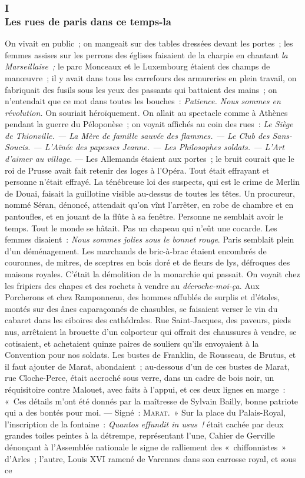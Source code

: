 \documentclass[french,twoside]{book} %
\begin{document}
\subsubsection[{I. Les rues de paris dans ce temps-la}]{I \\
Les rues de paris dans ce temps-la}
\label{p2l1c1}
\noindent On vivait en public ; on mangeait sur des tables dressées devant les portes ; les femmes assises sur les perrons des églises faisaient de la charpie en chantant \emph{la Marseillaise ;} le parc Monceaux et le Luxembourg étaient des champs de manœuvre ; il y avait dans tous les carrefours des armureries en plein travail, on fabriquait des fusils sous les yeux des passants qui battaient des mains ; on n’entendait que ce mot dans toutes les bouches : \emph{Patience. Nous sommes en révolution.} On souriait héroïquement. On allait au spectacle comme à Athènes pendant la guerre du Péloponèse ; on voyait affichés au coin des rues : \emph{Le Siège de Thionville. — La Mère de famille sauvée des flammes. — Le Club des Sans-Soucis. — L’Aînée des papesses Jeanne. — Les Philosophes soldats. — L’Art  d’aimer au village}. — Les Allemands étaient aux portes ; le bruit courait que le roi de Prusse avait fait retenir des loges à l’Opéra. Tout était effrayant et personne n’était effrayé. La ténébreuse loi des suspects, qui est le crime de Merlin de Douai, faisait la guillotine visible au-dessus de toutes les têtes. Un procureur, nommé Séran, dénoncé, attendait qu’on vînt l’arrêter, en robe de chambre et en pantoufles, et en jouant de la flûte à sa fenêtre. Personne ne semblait avoir le temps. Tout le monde se hâtait. Pas un chapeau qui n’eût une cocarde. Les femmes disaient : \emph{Nous sommes jolies sous le bonnet rouge}. Paris semblait plein d’un déménagement. Les marchands de bric-à-brac étaient encombrés de couronnes, de mitres, de sceptres en bois doré et de fleurs de lys, défroques des maisons royales. C’était la démolition de la monarchie qui passait. On voyait chez les fripiers des chapes et des rochets à vendre au \emph{décroche-moi-ça}. Aux Porcherons et chez Ramponneau, des hommes affublés de surplis et d’étoles, montés sur des ânes caparaçonnés de chasubles, se faisaient verser le vin du cabaret dans les ciboires des cathédrales. Rue Saint-Jacques, des paveurs, pieds nus, arrêtaient la brouette d’un colporteur qui offrait des chaussures à vendre, se cotisaient, et achetaient quinze paires de souliers qu’ils envoyaient à la Convention pour nos soldats. Les bustes de Franklin, de Rousseau, de Brutus, et il faut ajouter de Marat, abondaient ; au-dessous d’un de ces bustes de Marat, rue Cloche-Perce, était accroché sous verre, dans un cadre de bois noir, un réquisitoire  contre Malouet, avec faits à l’appui, et ces deux lignes en marge : « Ces détails m’ont été donnés par la maîtresse de Sylvain Bailly, bonne patriote qui a des bontés pour moi. — Signé : M{\scshape arat}. » Sur la place du Palais-Royal, l’inscription de la fontaine : \emph{Quantos effundit in usus !} était cachée par deux grandes toiles peintes à la détrempe, représentant l’une, Cahier de Gerville dénonçant à l’Assemblée nationale le signe de ralliement des « chiffonnistes » d’Arles ; l’autre, Louis XVI ramené de Varennes dans son carrosse royal, et sous ce 
\end{document}
